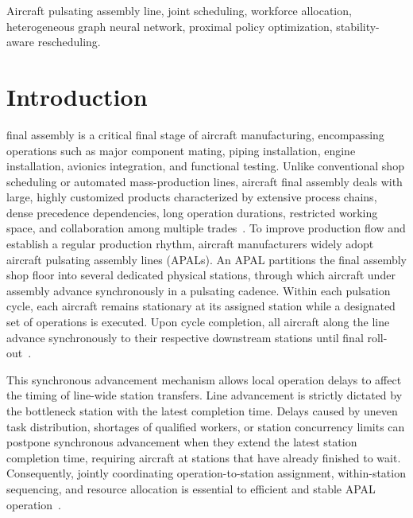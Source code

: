 \documentclass[journal,10pt]{IEEEtran}
\begin{document}
\begin{IEEEkeywords}
Aircraft pulsating assembly line, joint scheduling, workforce allocation, heterogeneous graph neural network, proximal policy optimization, stability-aware rescheduling.
\end{IEEEkeywords}

\section{Introduction}\label{sec:intro}

 final assembly is a critical final stage of aircraft manufacturing, encompassing operations such as major component mating, piping installation, engine installation, avionics integration, and functional testing. Unlike conventional shop scheduling or automated mass-production lines, aircraft final assembly deals with large, highly customized products characterized by extensive process chains, dense precedence dependencies, long operation durations, restricted working space, and collaboration among multiple trades~\cite{fang2021,bao2023,wang2024}. To improve production flow and establish a regular production rhythm, aircraft manufacturers widely adopt aircraft pulsating assembly lines (APALs). An APAL partitions the final assembly shop floor into several dedicated physical stations, through which aircraft under assembly advance synchronously in a pulsating cadence. Within each pulsation cycle, each aircraft remains stationary at its assigned station while a designated set of operations is executed. Upon cycle completion, all aircraft along the line advance synchronously to their respective downstream stations until final roll-out~\cite{lu2019}.

This synchronous advancement mechanism allows local operation delays to affect the timing of line-wide station transfers. Line advancement is strictly dictated by the bottleneck station with the latest completion time. Delays caused by uneven task distribution, shortages of qualified workers, or station concurrency limits can postpone synchronous advancement when they extend the latest station completion time, requiring aircraft at stations that have already finished to wait. Consequently, jointly coordinating operation-to-station assignment, within-station sequencing, and resource allocation is essential to efficient and stable APAL operation~\cite{becker2006,boysen2007,bao2023}.
\end{document}
